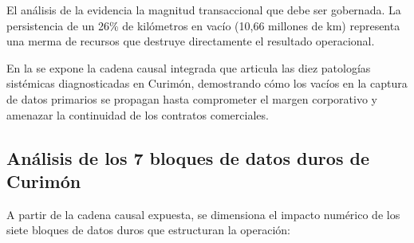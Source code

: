 El análisis de la  evidencia la magnitud transaccional que debe ser gobernada. La persistencia de un 26\% de kilómetros en vacío (10,66 millones de km) representa una merma de recursos que destruye directamente el resultado operacional.

En la  se expone la cadena causal integrada que articula las diez patologías sistémicas diagnosticadas en Curimón, demostrando cómo los vacíos en la captura de datos primarios se propagan hasta comprometer el margen corporativo y amenazar la continuidad de los contratos comerciales.


\subsection{Análisis de los 7 bloques de datos duros de Curimón}\label{sec:2-datos-duros}

A partir de la cadena causal expuesta, se dimensiona el impacto numérico de los siete bloques de datos duros que estructuran la operación:

